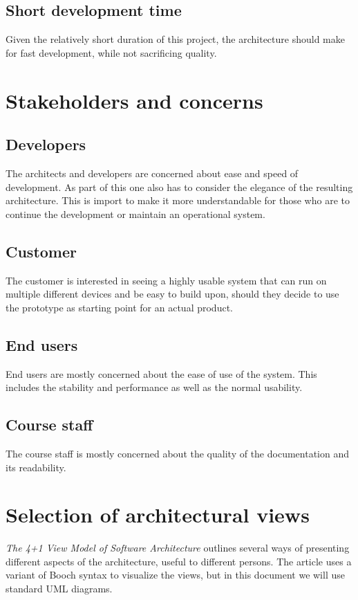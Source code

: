 \documentclass[11pt]{book}
\begin{document}
\subsection{Short development time}
Given the relatively short duration of this project, the architecture should make for fast development, while not sacrificing quality.

\section{Stakeholders and concerns}

\subsection{Developers}
The architects and developers are concerned about ease and speed of development. As part of this one also has to consider the elegance of the resulting architecture. This is import to make it more understandable for those who are to continue the development or maintain an operational system.

\subsection{Customer}
The customer is interested in seeing a highly usable system that can run on multiple different devices and be easy to build upon, should they decide to use the prototype as starting point for an actual product.

\subsection{End users}
End users are mostly concerned about the ease of use of the system. This includes the stability and performance as well as the normal usability.

\subsection{Course staff}
The course staff is mostly concerned about the quality of the documentation and its readability.

\section{Selection of architectural views}
\emph{The 4+1 View Model of Software Architecture} \cite{Kruchten:1995:VMA:624610.625529} outlines several ways of presenting different aspects of the architecture, useful to different persons. The article uses a variant of Booch syntax to visualize the views, but in this document we will use standard UML diagrams.
\end{document}
